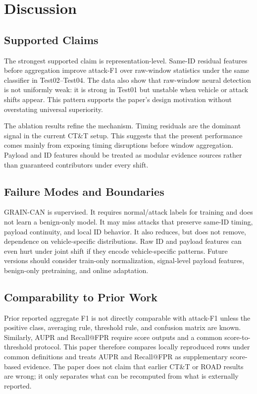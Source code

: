 \documentclass[runningheads]{llncs}
\newcommand{\method}{GRAIN-CAN}
\begin{document}
\section{Discussion}
\subsection{Supported Claims}
The strongest supported claim is representation-level. Same-ID residual features before aggregation improve attack-F1 over raw-window statistics under the same classifier in Test02--Test04. The data also show that raw-window neural detection is not uniformly weak: it is strong in Test01 but unstable when vehicle or attack shifts appear. This pattern supports the paper's design motivation without overstating universal superiority.

The ablation results refine the mechanism. Timing residuals are the dominant signal in the current CT\&T setup. This suggests that the present performance comes mainly from exposing timing disruptions before window aggregation. Payload and ID features should be treated as modular evidence sources rather than guaranteed contributors under every shift.

\subsection{Failure Modes and Boundaries}
\method{} is supervised. It requires normal/attack labels for training and does not learn a benign-only model. It may miss attacks that preserve same-ID timing, payload continuity, and local ID behavior. It also reduces, but does not remove, dependence on vehicle-specific distributions. Raw ID and payload features can even hurt under joint shift if they encode vehicle-specific patterns. Future versions should consider train-only normalization, signal-level payload features, benign-only pretraining, and online adaptation.

\subsection{Comparability to Prior Work}
Prior reported aggregate F1 is not directly comparable with attack-F1 unless the positive class, averaging rule, threshold rule, and confusion matrix are known. Similarly, AUPR and Recall@FPR require score outputs and a common score-to-threshold protocol. This paper therefore compares locally reproduced rows under common definitions and treats AUPR and Recall@FPR as supplementary score-based evidence. The paper does not claim that earlier CT\&T or ROAD results are wrong; it only separates what can be recomputed from what is externally reported.
\end{document}
